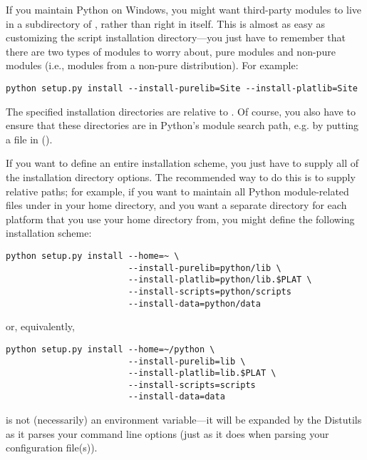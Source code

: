 \documentclass{howto}
\begin{document}
If you maintain Python on Windows, you might want third-party modules to
live in a subdirectory of , rather than right in
 itself.  This is almost as easy as customizing the
script installation directory---you just have to remember that there are
two types of modules to worry about, pure modules and non-pure modules
(i.e., modules from a non-pure distribution).  For example:
\begin{verbatim}
python setup.py install --install-purelib=Site --install-platlib=Site
\end{verbatim}
The specified installation directories are relative to .
Of course, you also have to ensure that these directories are in
Python's module search path, e.g. by putting a  file in
 ().

If you want to define an entire installation scheme, you just have to
supply all of the installation directory options.  The recommended way
to do this is to supply relative paths; for example, if you want to
maintain all Python module-related files under  in your
home directory, and you want a separate directory for each platform that
you use your home directory from, you might define the following
installation scheme:
\begin{verbatim}
python setup.py install --home=~ \
                        --install-purelib=python/lib \
                        --install-platlib=python/lib.$PLAT \
                        --install-scripts=python/scripts
                        --install-data=python/data
\end{verbatim}
or, equivalently,
\begin{verbatim}
python setup.py install --home=~/python \
                        --install-purelib=lib \
                        --install-platlib=lib.$PLAT \
                        --install-scripts=scripts
                        --install-data=data
\end{verbatim}
\code{\$PLAT} is not (necessarily) an environment variable---it will be
expanded by the Distutils as it parses your command line options (just
as it does when parsing your configuration file(s)).
\end{document}
